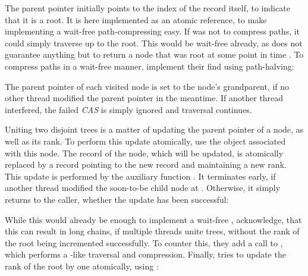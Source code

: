 The parent pointer initially points to the index of the record itself, to
indicate that it is a root. It is here implemented as an atomic reference, to
make implementing a wait-free path-compressing  easy. If
 was not to compress paths, it could simply traverse up to the
root. This would be wait-free already, as  does not guarantee
anything but to return a node that was root at some point in time
\cite{Anderson1994Waitfree}. To compress paths in a wait-free manner,
\citet{Anderson1994Waitfree} implement their find using path-halving:



The parent pointer of each visited node is set to the node's grandparent, if no
other thread modified the parent pointer in the meantime. If another thread
interfered, the failed \emph{CAS} is simply ignored and traversal continues.

Uniting two disjoint trees is a matter of updating the parent pointer of a node,
as well as its rank. To perform this update atomically,
\citet{Anderson1994Waitfree} use the  object associated with
this node. The record of the node, which will be updated, is atomically replaced
by a record pointing to the new record and maintaining a new rank. This update
is performed by the auxiliary function . It terminates
early, if another thread modified the soon-to-be child node at
. Otherwise, it simply returns to the caller, whether the update
has been successful:



While this would already be enough to implement a wait-free ,
\citet{Anderson1994Waitfree} acknowledge, that this can result in long chains,
if multiple threads unite trees, without the rank of the root being incremented
successfully. To counter this, they add a call to , which
performs a -like traversal and compression. Finally,
 tries to update the rank of the root by one atomically,
using :



